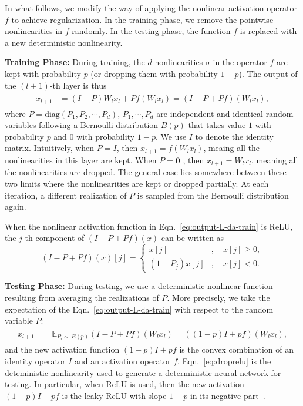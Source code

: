 \documentclass[11pt]{article}
\begin{document}
In what follows, we modify the way of applying the nonlinear activation operator $f$ to achieve regularization.
In the training phase, we remove the pointwise nonlinearities in $f$ randomly. In the testing phase, the function $f$ is replaced with a new deterministic nonlinearity.

\textbf{Training Phase:}  During training, the $d$ nonlinearities $\sigma$ in the operator $f$ are kept with probability $p$ (or dropping them with probability $1-p$). The output of the $(l+1)$-th layer is thus
\begin{align}
\begin{split}
x_{l+1} &= (I-P)W_lx_l + Pf(W_lx_l) = (I-P+Pf)(W_lx_l),
\end{split}
\label{eq:output-L-da-train}
\end{align}
where $P = \text{diag}(P_1,P_2,\cdots,P_d)$, $P_1,\cdots,P_d$ are independent and identical random variables following a Bernoulli distribution $B(p)$ that takes value $1$ with probability $p$ and $0$ with probability $1-p$. We use $I$ to denote the identity matrix. Intuitively, when $P = I$, then $x_{l+1} = f(W_lx_l)$, meaing all the nonlinearities in this layer are kept. When $P = \mathbf{0}$ , then $x_{l+1} = W_lx_l$, meaning all the nonlinearities are dropped. The general case lies somewhere between these two limits where the nonlinearities are kept or dropped partially. At each iteration, a different realization of $P$ is sampled from the Bernoulli distribution again. 

When the nonlinear activation function in Eqn.~\eqref{eq:output-L-da-train} is ReLU, the $j$-th component of $(I-P+Pf)(x)$ can be written as
\begin{equation}
(I-P+Pf)(x)[j] = \left\{
\begin{aligned}
x[j]&, \quad x[j]\geq 0,\\
(1-P_j)x[j]&, \quad x[j]<0.
\end{aligned}
\right.
\label{eq:droprelu}
\end{equation}


\textbf{Testing Phase:} During testing, we use a deterministic nonlinear function resulting from averaging the realizations of $P$. More precisely, we take the expectation of the Eqn.~\eqref{eq:output-L-da-train} with respect to the random variable $P$:
\begin{align}
\begin{split}
x_{l+1} &= \mathbb{E}_{P_i\sim \ B(p)} (I-P+Pf)(W_lx_l) = ((1-p)I + pf)(W_lx_l),
\end{split}
\label{eq:output-L-da-test}
\end{align}
and the new activation function $(1-p)I + pf$ is the convex combination of an  identity operator $I$ and an activation operator $f$. Eqn.~\eqref{eq:droprelu} is the deteministic nonlinearity used to generate a deterministic neural network for testing. In particular, when ReLU is used, then the new activation $(1-p)I + pf$ is the leaky ReLU with slope $1 - p$ in its negative part~\cite{rrelu}.
\end{document}
